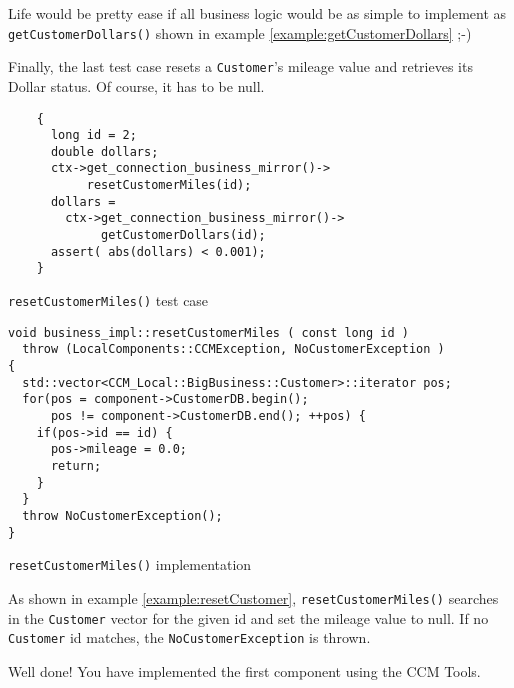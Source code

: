 Life would be pretty ease if all business logic would be as simple to implement as  
{\tt getCustomerDollars()} shown in example \ref{example:getCustomerDollars} ;-)


Finally, the last test case resets a {\tt Customer}'s mileage value and retrieves
its Dollar status. Of course, it has to be null.

\begin{Example}
\begin{minifbox}
\begin{small}
\begin{verbatim}
    {
      long id = 2;
      double dollars;
      ctx->get_connection_business_mirror()->
           resetCustomerMiles(id);
      dollars = 
        ctx->get_connection_business_mirror()->
             getCustomerDollars(id); 
      assert( abs(dollars) < 0.001);
    }
\end{verbatim}
\end{small}
\end{minifbox}
\caption{{\tt resetCustomerMiles()} test case}
\label{example:}
\end{Example}



\begin{Example}
\begin{minifbox}
\begin{small}
\begin{verbatim}
void business_impl::resetCustomerMiles ( const long id )
  throw (LocalComponents::CCMException, NoCustomerException )
{
  std::vector<CCM_Local::BigBusiness::Customer>::iterator pos;
  for(pos = component->CustomerDB.begin(); 
      pos != component->CustomerDB.end(); ++pos) {
    if(pos->id == id) {
      pos->mileage = 0.0;
      return;
    }
  }
  throw NoCustomerException(); 
}
\end{verbatim}
\end{small}
\end{minifbox}
\caption{{\tt resetCustomerMiles()} implementation}
\label{example:resetCustomer}
\end{Example}
As shown in example \ref{example:resetCustomer}, {\tt resetCustomerMiles()} searches 
in the {\tt Customer}
vector for the given id and set the mileage value to null.
If no {\tt Customer} id matches, the {\tt NoCustomerException} is thrown.

Well done! You have implemented the first component using the CCM Tools.


\newpage
